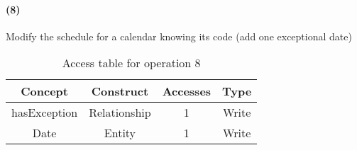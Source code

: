 	\paragraph{(8)} Modify the schedule for a calendar knowing its code (add one exceptional date)
	\begin{table}[h!]
		\centering
		\begin{tabular}{|c|c|c|c|}
			\hline
			\textbf{Concept} & \textbf{Construct} & \textbf{Accesses} & \textbf{Type} \\
			\hline
			hasException & Relationship & 1 & Write \\ \hline
			Date & Entity & 1 & Write \\ \hline
		\end{tabular}
		\caption{Access table for operation 8}\label{tbl:access-8}
	\end{table}